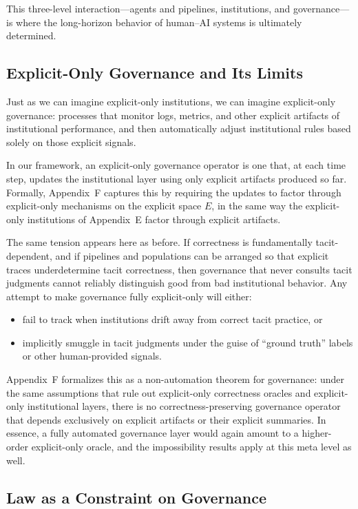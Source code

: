 \documentclass[11pt]{article}
\theoremstyle{definition}
\begin{document}
This three-level interaction---agents and pipelines, institutions, and governance---is where the long-horizon behavior of human--AI systems is ultimately determined.

\subsection{Explicit-Only Governance and Its Limits}

Just as we can imagine explicit-only institutions, we can imagine explicit-only governance: processes that monitor logs, metrics, and other explicit artifacts of institutional performance, and then automatically adjust institutional rules based solely on those explicit signals.

In our framework, an explicit-only governance operator is one that, at each time step, updates the institutional layer using only explicit artifacts produced so far. Formally, Appendix~F captures this by requiring the updates to factor through explicit-only mechanisms on the explicit space $E$, in the same way the explicit-only institutions of Appendix~E factor through explicit artifacts.

The same tension appears here as before. If correctness is fundamentally tacit-dependent, and if pipelines and populations can be arranged so that explicit traces underdetermine tacit correctness, then governance that never consults tacit judgments cannot reliably distinguish good from bad institutional behavior. Any attempt to make governance fully explicit-only will either:
\begin{itemize}
  \item fail to track when institutions drift away from correct tacit practice, or
  \item implicitly smuggle in tacit judgments under the guise of ``ground truth'' labels or other human-provided signals.
\end{itemize}

Appendix~F formalizes this as a non-automation theorem for governance: under the same assumptions that rule out explicit-only correctness oracles and explicit-only institutional layers, there is no correctness-preserving governance operator that depends exclusively on explicit artifacts or their explicit summaries. In essence, a fully automated governance layer would again amount to a higher-order explicit-only oracle, and the impossibility results apply at this meta level as well.

\subsection{Law as a Constraint on Governance}
\end{document}
